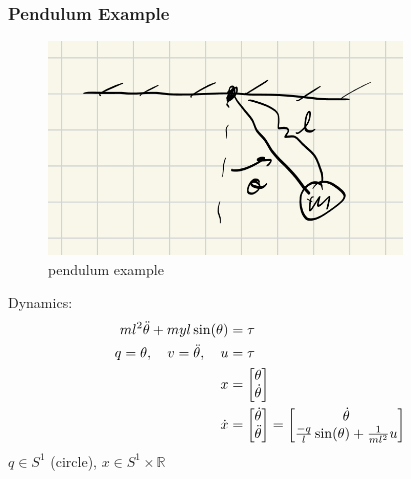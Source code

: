 \documentclass[11pt]{article}
\begin{document}
\subsubsection{Pendulum Example}
\begin{figure}[H]
    \centering
    \includegraphics[width=0.5\linewidth]{lecture_1_1.png}
    \caption{pendulum example}
    \label{pendulum}
\end{figure}
Dynamics:
\begin{align*}
    ml^2\Ddot{\theta} + myl\sin(\theta) &= \tau
    \\
    q = \theta, \quad v = \Ddot{\theta}, \quad u&=\tau
    \\
    x &= \begin{bmatrix}
        \theta \\
        \dot{\theta}
    \end{bmatrix}
    \\
    \dot{x} &= \begin{bmatrix}
        \dot{\theta} \\
        \Ddot{\theta}
    \end{bmatrix}
 =
 \begin{bmatrix}
     \dot{\theta} \\
     \frac{-q}{l}\sin(\theta)+\frac{1}{ml^2}u
 \end{bmatrix}
\end{align*}
$q\in S^1$ (circle), $x\in S^1\times \mathbb{R}$ 
\end{document}
